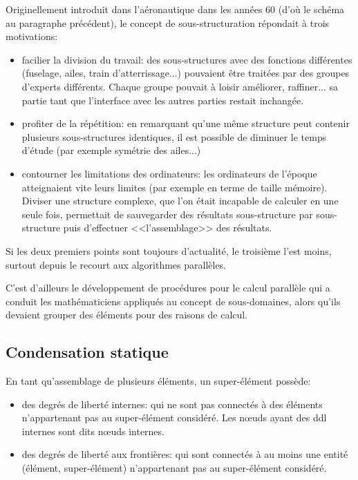 \medskip
\begin{histoire}
Originellement introduit dans l'aéronautique dans les années 60 (d'où le schéma
au paragraphe précédent), le concept de sous-structuration 
répondait à trois motivations:
\begin{itemize}
   \item facilier la division du travail: 
	des sous-structures avec des fonctions différentes (fuselage, ailes, train d'atterrissage...)
	pouvaient être traitées par des groupes d'experts différents. Chaque groupe pouvait
	à loisir améliorer, raffiner... sa partie tant que l'interface avec les autres parties
	restait inchangée.
   \item profiter de la répétition:
	en remarquant qu'une même structure peut contenir plusieurs sous-structures identiques,
	il est possible de diminuer le temps d'étude (par exemple symétrie des ailes...)
   \item contourner les limitations des ordinateurs:
	les ordinateurs de l'époque atteignaient vite leurs limites (par exemple en terme
	de taille mémoire). Diviser une structure complexe, que l'on était incapable de
	calculer en une seule fois, permettait de sauvegarder des résultats sous-structure 
	par sous-structure puis d'effectuer <<l'assemblage>> des résultats.
\end{itemize}
Si les deux premiers points sont toujours d'actualité, le troisième l'est moins, surtout
depuis le recourt aux algorithmes parallèles.

C'est d'ailleurs le développement  de procédures pour le calcul parallèle qui a conduit
les mathématiciens appliqués au concept de sous-domaines, alors qu'ils devaient grouper
des éléments pour des raisons de calcul.
\end{histoire}

\medskip
\subsection{Condensation statique}\label{Sec-condens}

En tant qu'assemblage de plusieurs éléments, un super-élément possède:
\begin{itemize}
   \item des degrés de liberté internes:
	qui ne sont pas connectés à des éléments n'appartenant pas au super-élément considéré.
	Les nœuds ayant des ddl internes sont dits nœuds internes.
   \item des degrés de liberté aux frontières:
	qui sont connectés à au moins une entité (élément, super-élément)
	n'appartenant pas au super-élément considéré.
\end{itemize}


